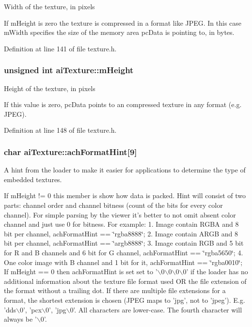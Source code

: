 Width of the texture, in pixels

If mHeight is zero the texture is compressed in a format like JPEG. In this case mWidth specifies the size of the memory area pcData is pointing to, in bytes. 

Definition at line 141 of file texture.h.\hypertarget{structai_texture_c1e2fa6f1f646e9c55e3985d4418a752}{
\subsubsection[mHeight]{\setlength{\rightskip}{0pt plus 5cm}unsigned int {\bf aiTexture::mHeight}}}
\label{structai_texture_c1e2fa6f1f646e9c55e3985d4418a752}


Height of the texture, in pixels

If this value is zero, pcData points to an compressed texture in any format (e.g. JPEG). 

Definition at line 148 of file texture.h.\hypertarget{structai_texture_8e281d19486df620af1b2869464fa5c0}{
\subsubsection[achFormatHint]{\setlength{\rightskip}{0pt plus 5cm}char {\bf aiTexture::achFormatHint}\mbox{[}9\mbox{]}}}
\label{structai_texture_8e281d19486df620af1b2869464fa5c0}


A hint from the loader to make it easier for applications to determine the type of embedded textures.

If mHeight != 0 this member is show how data is packed. Hint will consist of two parts: channel order and channel bitness (count of the bits for every color channel). For simple parsing by the viewer it's better to not omit absent color channel and just use 0 for bitness. For example: 1. Image contain RGBA and 8 bit per channel, achFormatHint == \char`\"{}rgba8888\char`\"{}; 2. Image contain ARGB and 8 bit per channel, achFormatHint == \char`\"{}argb8888\char`\"{}; 3. Image contain RGB and 5 bit for R and B channels and 6 bit for G channel, achFormatHint == \char`\"{}rgba5650\char`\"{}; 4. One color image with B channel and 1 bit for it, achFormatHint == \char`\"{}rgba0010\char`\"{}; If mHeight == 0 then achFormatHint is set set to '$\backslash$0$\backslash$0$\backslash$0$\backslash$0' if the loader has no additional information about the texture file format used OR the file extension of the format without a trailing dot. If there are multiple file extensions for a format, the shortest extension is chosen (JPEG maps to 'jpg', not to 'jpeg'). E.g. 'dds$\backslash$0', 'pcx$\backslash$0', 'jpg$\backslash$0'. All characters are lower-case. The fourth character will always be '$\backslash$0'. 


